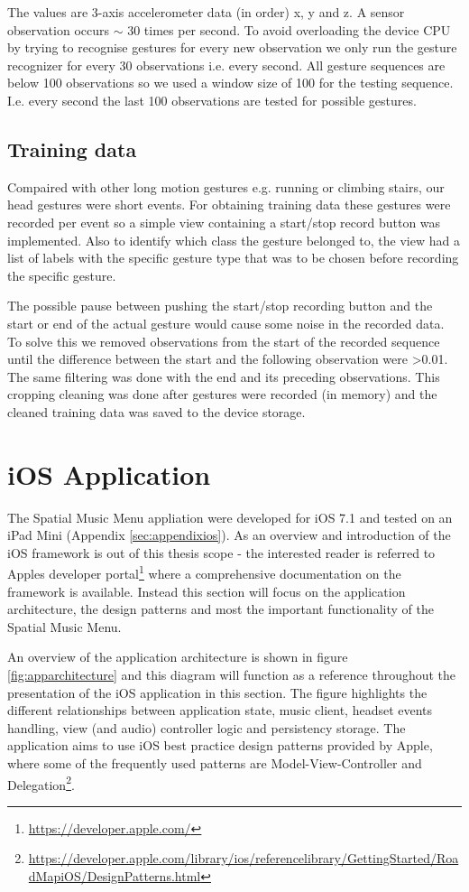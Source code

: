 The values are 3-axis accelerometer data (in order) x, y and z. A sensor observation occurs $\sim$ 30 times per second. To avoid overloading the device CPU by trying to recognise gestures for every new observation we only run the gesture recognizer for every 30 observations i.e. every second. All gesture sequences are below 100 observations so we used a window size of 100 for the testing sequence. I.e. every second the last 100 observations are tested for possible gestures.

\subsection{Training data}
Compaired with other long motion gestures e.g. running or climbing stairs, our head gestures were short events. For obtaining training data these gestures were recorded per event so a simple view containing a start/stop record button was implemented. Also to identify which class the gesture belonged to, the view had a list of labels with the specific gesture type that was to be chosen before recording the specific gesture.

The possible pause between pushing the start/stop recording button and the start or end of the actual gesture would cause some noise in the recorded data. To solve this we removed observations from the start of the recorded sequence until the difference between the start and the following observation were \textgreater 0.01. The same filtering was done with the end and its preceding observations. This cropping cleaning was done after gestures were recorded (in memory) and the cleaned training data was saved to the device storage.


\section{iOS Application}
The Spatial Music Menu appliation were developed for iOS 7.1 and tested on an iPad Mini (Appendix \ref{sec:appendixios}). As an overview and introduction of the iOS framework is out of this thesis scope - the interested reader is referred to Apples developer portal\footnote{\url{https://developer.apple.com/}} where a comprehensive documentation on the framework is available. Instead this section will focus on the application architecture, the design patterns and most the important functionality of the Spatial Music Menu.

An overview of the application architecture is shown in figure \ref{fig:apparchitecture} and this diagram will function as a reference throughout the presentation of the iOS application in this section. The figure highlights the different relationships between application state, music client, headset events handling, view (and audio) controller logic and persistency storage. The application aims to use iOS best practice design patterns provided by Apple, where some of the frequently used patterns are Model-View-Controller and Delegation\footnote{\url{https://developer.apple.com/library/ios/referencelibrary/GettingStarted/RoadMapiOS/DesignPatterns.html}}.

